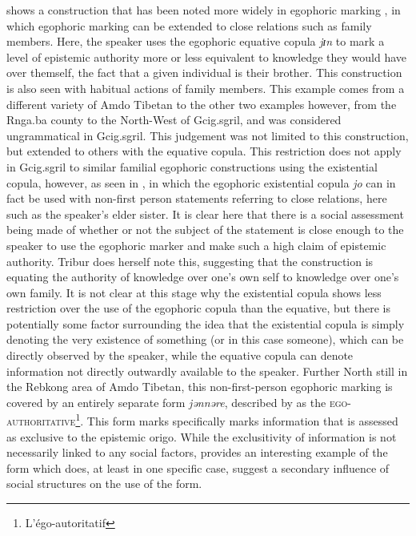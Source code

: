  shows a construction that has been noted more widely in egophoric marking \cite{EgoIntro}, in which egophoric marking can be extended to close relations such as family members. Here, the speaker uses the egophoric equative copula \textit{jɪn} to mark a level of epistemic authority more or less equivalent to knowledge they would have over themself, the fact that a given individual is their brother. This construction is also seen with habitual actions of family members. This example comes from a different variety of Amdo Tibetan to the other two examples however, from the Rnga.ba county to the North-West of Gcig.sgril, and was considered ungrammatical in Gcig.sgril. This judgement was not limited to this construction, but extended to others with the equative copula. This restriction does not apply in Gcig.sgril to similar familial egophoric constructions using the existential copula, however, as seen in , in which the egophoric existential copula \textit{jo} can in fact be used with non-first person statements referring to close relations, here such as the speaker's elder sister. It is clear here that there is a social assessment being made of whether or not the subject of the statement is close enough to the speaker to use the egophoric marker and make such a high claim of epistemic authority. Tribur does herself note this, suggesting that the construction is equating the authority of knowledge over one's own self to knowledge over one's own family. It is not clear at this stage why the existential copula shows less restriction over the use of the egophoric copula than the equative, but there is potentially some factor surrounding the idea that the existential copula is simply denoting the very existence of something (or in this case someone), which can be directly observed by the speaker, while the equative copula can denote information not directly outwardly available to the speaker. Further North still in the Rebkong area of Amdo Tibetan, this non-first-person egophoric marking is covered by an entirely separate form \textit{jənnəre}, described by  as the \textsc{ego-authoritative}\footnote{L'égo-autoritatif}. This form marks specifically marks information that is assessed as exclusive to the epistemic origo. While the exclusitivity of information is not necessarily linked to any social factors,  provides an interesting example of the form which does, at least in one specific case, suggest a secondary influence of social structures on the use of the form.

